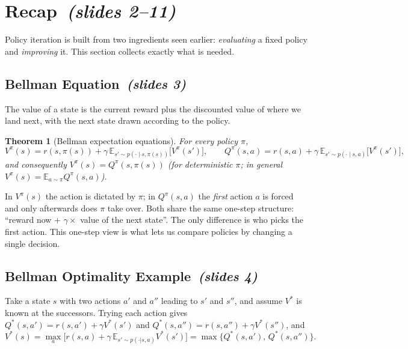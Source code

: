 \documentclass[11pt,a4paper]{article}
\newcommand{\E}{\mathbb{E}}
\newcommand{\sltag}[1]{\texorpdfstring{\ \emph{(slides #1)}}{ (slides #1)}}
\theoremstyle{plain}
\newtheorem{theorem}{Theorem}[section]
\theoremstyle{definition}
\theoremstyle{remark}
\begin{document}
\section{Recap\sltag{2--11}}
Policy iteration is built from two ingredients seen earlier: \emph{evaluating} a fixed policy and \emph{improving} it. This section collects exactly what is needed.

\subsection{Bellman Equation\sltag{3}}
The value of a state is the current reward plus the discounted value of where we land next, with the next state drawn according to the policy.

\begin{theorem}[Bellman expectation equations]\label{thm:bellman-exp}
For every policy $\pi$,
\[
V^\pi(s)=r(s,\pi(s))+\gamma\,\E_{s'\sim p(\cdot\mid s,\pi(s))}\big[V^\pi(s')\big],\qquad
Q^\pi(s,a)=r(s,a)+\gamma\,\E_{s'\sim p(\cdot\mid s,a)}\big[V^\pi(s')\big],
\]
and consequently $V^\pi(s)=Q^\pi(s,\pi(s))$ (for deterministic $\pi$; in general $V^\pi(s)=\E_{a\sim\pi}Q^\pi(s,a)$).
\end{theorem}

\begin{intuition}
In $V^\pi(s)$ the action is dictated by $\pi$; in $Q^\pi(s,a)$ the \emph{first} action $a$ is forced and only afterwards does $\pi$ take over. Both share the same one-step structure: ``reward now + $\gamma\times$ value of the next state''. The only difference is who picks the first action. This one-step view is what lets us compare policies by changing a single decision.
\end{intuition}

\subsection{Bellman Optimality Example\sltag{4}}
Take a state $s$ with two actions $a'$ and $a''$ leading to $s'$ and $s''$, and assume $V^*$ is known at the successors. Trying each action gives $Q^*(s,a')=r(s,a')+\gamma V^*(s')$ and $Q^*(s,a'')=r(s,a'')+\gamma V^*(s'')$, and
\[
V^*(s)=\max_a\Big[r(s,a)+\gamma\,\E_{s'\sim p(\cdot|s,a)}V^*(s')\Big]=\max\big\{Q^*(s,a'),\,Q^*(s,a'')\big\}.
\]
\end{document}

